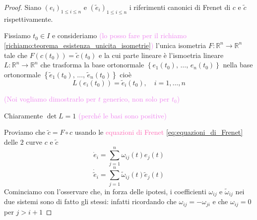         \begin{proof}
        \mbox{}

        Siano $\left(e_i\right)_{1 \leq i \leq n}$ e $\left(\tilde{e}_i\right)_{1 \leq i \leq n}$ i riferimenti canonici di Frenet di $c$ e $\tilde{c}$ rispettivamente.

        Fissiamo $t_0 \in I$ e consideriamo \textcolor{violet}{(lo posso fare per il richiamo \ref{richiamo:teorema_esistenza_unicita_isometrie})} l'unica isometria $F: \mathbb{R}^n \to \mathbb{R}^n$ tale che $F(c(t_0)) = \tilde{c}(t_0)$ e la cui parte lineare è 
        l'ismoetria lineare $L \colon \mathbb{R}^n \to \mathbb{R}^n$ che trasforma la base ortonormale $\left\{e_1(t_0), \, \dots, \, e_n(t_0) \right\}$ nella base ortonormale
        $\left\{\tilde{e}_1(t_0), \, \dots, \, \tilde{e}_n(t_0) \right\}$ cioè 
        \begin{equation}
        \label{eq:dimmostrazione_curva_univocamente_determinata_a_meno_di_isometrie_1}
        L(e_i(t_0)) = \tilde{e}_i(t_0), \quad i=1, \dots, n
        \end{equation}
        
        \textcolor{violet}{(Noi vogliamo dimostrarlo per $t$ generico, non solo per $t_0$)}

        Chiaramente $\det L = 1$ \textcolor{violet}{(perché le basi sono positive)}

        Proviamo che $\tilde{c} = F \circ c$ usando le \textcolor{hotpink}{equazioni di Frenet} \eqref{eq:equazioni_di_Frenet} delle $2$ curve $c$ e $\tilde{c}$
        \begin{equation}
        \label{eq:dimmostrazione_curva_univocamente_determinata_a_meno_di_isometrie_2}
        \dot{e}_i = \sum_{j=1}^{n} \omega_{ij} (t)  e_j(t)  
        \end{equation}
        \[ \dot{\tilde{e}}_i = \sum_{j=1}^{n} \tilde{\omega}_{ij} (t)  \tilde{e}_j(t) \]
        Cominciamo con l'osservare che, in forza delle ipotesi, i coefficienti $\omega_{ij}$ e $\tilde{\omega}_{ij}$ nei due sistemi sono di fatto gli stessi: infatti ricordando
        che $\omega_{ij}=-\omega_{ji}$ e che $\omega_{ij}=0$ per $j>i+1$ 


\end{proof}
